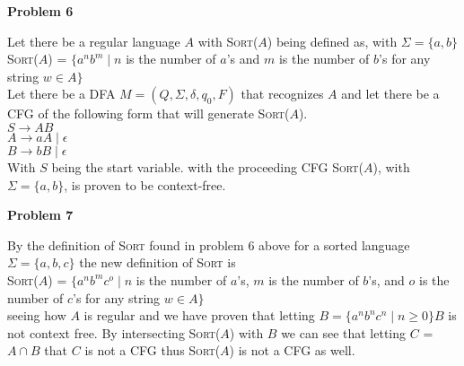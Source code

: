 \documentclass[letterpaper,12pt]{article}
\makeatletter
\newcommand*\langop{\textsc}
\newcommand\exercise[1]{\par\vspace{4ex}\normalfont\normalsize\noindent
\textbf{\large Problem #1}\par\nobreak\@afterindentfalse\@afterheading}
\makeatother
\begin{document}
\exercise{6}
Let there be a regular language $A$ with \langop{Sort}($A$) being defined as, with $\Sigma = \{a, b\}$ \\
\langop{Sort}($A$) = $\{a^nb^m \mid n$ is the number of $a$'s and $m$ is the number of $b$'s for any string $w \in A\}$\\
Let there be a DFA $M = (Q, \Sigma, \delta, q_0, F)$ that recognizes $A$ and let there be a CFG of the following form that will generate \langop{Sort}($A$).\\
$S \rightarrow AB$\\
$A \rightarrow aA \mid \epsilon$\\
$B \rightarrow bB \mid \epsilon$\\
With $S$ being the start variable. with the proceeding CFG \langop{Sort}($A$), with $\Sigma = \{a, b\}$, is proven to be context-free.

\exercise{7}
By the definition of \langop{Sort} found in problem 6 above for a sorted language $\Sigma = \{a, b, c\}$ the new definition of \langop{Sort} is\\
 \langop{Sort}($A$) = $\{a^nb^mc^o \mid n$ is the number of $a$'s, $m$ is the number of $b$'s, and $o$ is the number of $c$'s for any string $w \in A\}$\\
 seeing how $A$ is regular and we have proven that letting $B =  \{a^nb^nc^n \mid n \geq 0\} B$ is not context free. By intersecting \langop{Sort}($A$) with $B$ we can see that letting $C$ = $A \cap B$ that $C$ is not a CFG thus \langop{Sort}($A$) is not a CFG as well.
\end{document}
